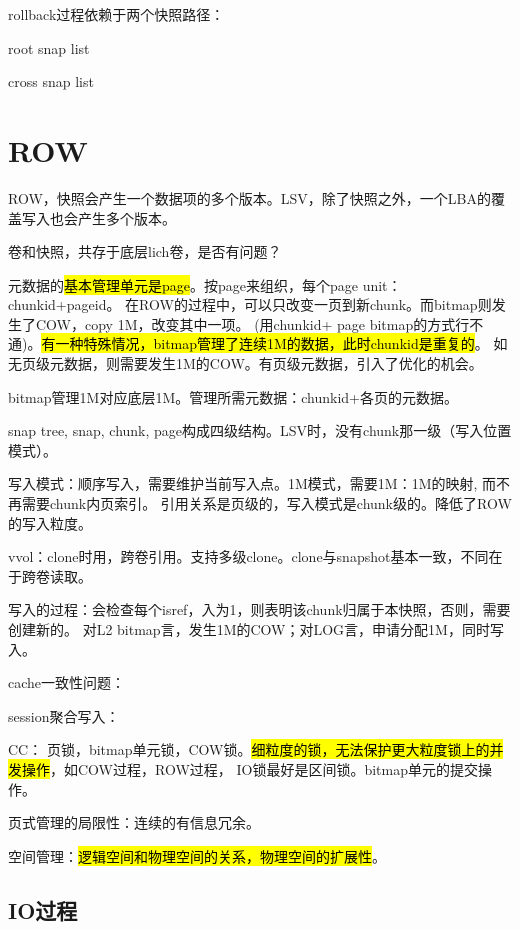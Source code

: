 rollback过程依赖于两个快照路径：
\begin{compactenum}
\item root snap list
\item cross snap list
\end{compactenum}


\section{ROW}


ROW，快照会产生一个数据项的多个版本。LSV，除了快照之外，一个LBA的覆盖写入也会产生多个版本。

卷和快照，共存于底层lich卷，是否有问题？

元数据的\hl{基本管理单元是page}。按page来组织，每个page unit：chunkid+pageid。
在ROW的过程中，可以只改变一页到新chunk。而bitmap则发生了COW，copy 1M，改变其中一项。
(用chunkid+ page bitmap的方式行不通)。\hl{有一种特殊情况，bitmap管理了连续1M的数据，此时chunkid是重复的}。
如无页级元数据，则需要发生1M的COW。有页级元数据，引入了优化的机会。

bitmap管理1M对应底层1M。管理所需元数据：chunkid+各页的元数据。

snap tree, snap, chunk, page构成四级结构。LSV时，没有chunk那一级（写入位置模式）。

写入模式：顺序写入，需要维护当前写入点。1M模式，需要1M：1M的映射, 而不再需要chunk内页索引。
引用关系是页级的，写入模式是chunk级的。降低了ROW的写入粒度。

vvol：clone时用，跨卷引用。支持多级clone。clone与snapshot基本一致，不同在于跨卷读取。

写入的过程：会检查每个isref，入为1，则表明该chunk归属于本快照，否则，需要创建新的。
对L2 bitmap言，发生1M的COW；对LOG言，申请分配1M，同时写入。

cache一致性问题：

session聚合写入：

CC： 页锁，bitmap单元锁，COW锁。\hl{细粒度的锁，无法保护更大粒度锁上的并发操作}，如COW过程，ROW过程，
IO锁最好是区间锁。bitmap单元的提交操作。

页式管理的局限性：连续的有信息冗余。

空间管理：\hl{逻辑空间和物理空间的关系，物理空间的扩展性}。

\subsection{IO过程}

